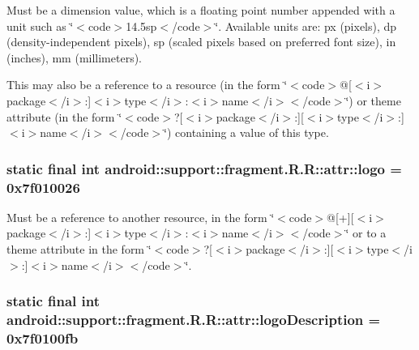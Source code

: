 Must be a dimension value, which is a floating point number appended with a unit such as \char`\"{}$<$code$>$14.5sp$<$/code$>$\char`\"{}. Available units are: px (pixels), dp (density-independent pixels), sp (scaled pixels based on preferred font size), in (inches), mm (millimeters). 

This may also be a reference to a resource (in the form \char`\"{}$<$code$>$@\mbox{[}$<$i$>$package$<$/i$>$:\mbox{]}$<$i$>$type$<$/i$>$:$<$i$>$name$<$/i$>$$<$/code$>$\char`\"{}) or theme attribute (in the form \char`\"{}$<$code$>$?\mbox{[}$<$i$>$package$<$/i$>$:\mbox{]}\mbox{[}$<$i$>$type$<$/i$>$:\mbox{]}$<$i$>$name$<$/i$>$$<$/code$>$\char`\"{}) containing a value of this type. \hypertarget{classandroid_1_1support_1_1fragment_1_1_r_1_1attr_c58fa846215dfbd447bbbd90540183a3}{
\subsubsection[{logo}]{\setlength{\rightskip}{0pt plus 5cm}static final int android::support::fragment.R.R::attr::logo = 0x7f010026}}
\label{classandroid_1_1support_1_1fragment_1_1_r_1_1attr_c58fa846215dfbd447bbbd90540183a3}


Must be a reference to another resource, in the form \char`\"{}$<$code$>$@\mbox{[}+\mbox{]}\mbox{[}$<$i$>$package$<$/i$>$:\mbox{]}$<$i$>$type$<$/i$>$:$<$i$>$name$<$/i$>$$<$/code$>$\char`\"{} or to a theme attribute in the form \char`\"{}$<$code$>$?\mbox{[}$<$i$>$package$<$/i$>$:\mbox{]}\mbox{[}$<$i$>$type$<$/i$>$:\mbox{]}$<$i$>$name$<$/i$>$$<$/code$>$\char`\"{}. \hypertarget{classandroid_1_1support_1_1fragment_1_1_r_1_1attr_ce777d48a0a3e63a03e65655ae8cb48e}{
\subsubsection[{logoDescription}]{\setlength{\rightskip}{0pt plus 5cm}static final int android::support::fragment.R.R::attr::logoDescription = 0x7f0100fb}}
\label{classandroid_1_1support_1_1fragment_1_1_r_1_1attr_ce777d48a0a3e63a03e65655ae8cb48e}


